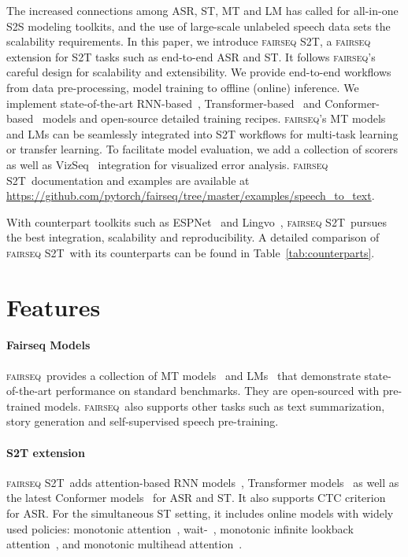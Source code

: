\documentclass[11pt,a4paper]{article}
\newcommand{\fairseq}{\textsc{fairseq}}
\newcommand{\stot}{\textsc{fairseq S2T}}
\begin{document}
The increased connections among ASR, ST, MT and LM has called for all-in-one S2S modeling toolkits, and the use of large-scale unlabeled speech data sets the scalability requirements. In this paper, we introduce \stot, a \fairseq~\citep{ott2019fairseq} extension for S2T tasks such as end-to-end ASR and ST. It follows \fairseq's careful design for scalability and extensibility. We provide end-to-end workflows from data pre-processing, model training to offline (online) inference. We implement state-of-the-art RNN-based~\citep{chan2016listen,berard2018end}, Transformer-based~\citep{vaswani2017attention,Mohamed2019TransformersWC} and Conformer-based~\citep{gulati20_interspeech} models and open-source detailed training recipes. \fairseq's MT models and LMs can be seamlessly integrated into S2T workflows for multi-task learning or transfer learning. To facilitate model evaluation, we add a collection of scorers as well as VizSeq~\citep{wang-etal-2019-vizseq} integration for visualized error analysis. \stot~documentation and examples are available at \url{https://github.com/pytorch/fairseq/tree/master/examples/speech_to_text}.

With counterpart toolkits such as ESPNet~\citep{inaguma-etal-2020-espnet} and Lingvo~\citep{shen2019lingvo}, \stot~pursues the best integration, scalability and reproducibility. A detailed comparison of \stot~with its counterparts can be found in Table~\ref{tab:counterparts}.


\section{Features}

\paragraph{Fairseq Models} \fairseq~provides a collection of MT models~\citep{ng-etal-2019-facebook,lewis2019bart} and LMs~\citep{liu2019roberta,conneau2019unsupervised} that demonstrate state-of-the-art performance on standard benchmarks. They are open-sourced with pre-trained models. \fairseq~also supports other tasks such as text summarization, story generation and self-supervised speech pre-training.

\paragraph{S2T extension} \stot~adds attention-based RNN models~\citep{chan2016listen,berard2018end}, Transformer models~\citep{vaswani2017attention,Mohamed2019TransformersWC} as well as the latest Conformer models~\citep{gulati20_interspeech} for ASR and ST. It also supports CTC criterion~\citep{graves2006connectionist} for ASR. For the simultaneous ST setting, it includes online models with widely used policies: monotonic attention~\citep{raffel2017online}, wait-~\citep{Ma2018STACLST},
monotonic infinite lookback attention~\citep{arivazhagan2019monotonic},
and monotonic multihead attention~\citep{ma2019monotonic}.
\end{document}
